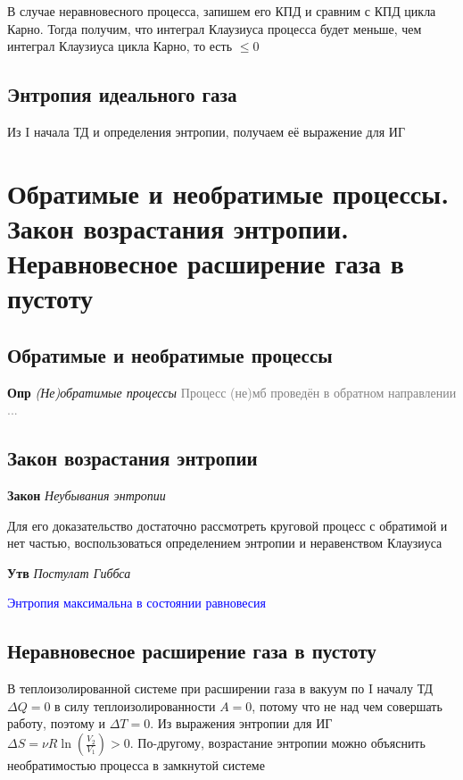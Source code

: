 \documentclass[a4paper, 14pt]{article}
\begin{document}
    В случае неравновесного процесса, запишем его КПД и сравним с КПД цикла Карно.
    Тогда получим, что интеграл Клаузиуса процесса будет меньше, чем интеграл Клаузиуса цикла Карно, то есть $\leq 0$

    \subsection{Энтропия идеального газа}

    Из I начала ТД и определения энтропии, получаем её выражение для ИГ

    \section{Обратимые и необратимые процессы.
    Закон возрастания энтропии.
    Неравновесное расширение газа в пустоту}

    \subsection{Обратимые и необратимые процессы}

    \textbf{Опр} \textit{(Не)обратимые процессы} \textcolor{gray}{Процесс (не)мб проведён в обратном направлении ...}

    \subsection{Закон возрастания энтропии}

    \textbf{Закон} \textit{Неубывания энтропии}

    Для его доказательство достаточно рассмотреть круговой процесс с обратимой и нет частью, воспользоваться
    определением энтропии и неравенством Клаузиуса

    \textbf{Утв} \textit{Постулат Гиббса}

    \textcolor{blue}{Энтропия максимальна в состоянии равновесия}

    \subsection{Неравновесное расширение газа в пустоту}

    В теплоизолированной системе при расширении газа в вакуум по I началу ТД $\Delta Q = 0$ в силу
    теплоизолированности $A = 0$, потому что не над чем совершать работу, поэтому и $\Delta T = 0$.
    Из выражения энтропии для ИГ $\Delta S = \nu R \ln \left(\frac{V_2}{V_1}\right) > 0$.
    По-другому, возрастание энтропии можно объяснить необратимостью процесса в замкнутой системе
\end{document}
